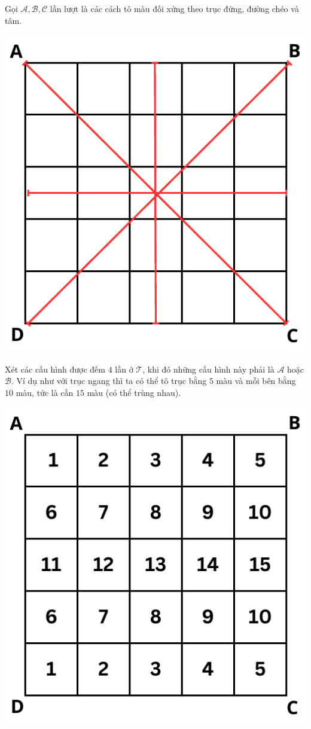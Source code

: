 \documentclass[11pt]{scrartcl}
\begin{document}
\begin{itemize}[label=, leftmargin=0em, itemsep=0.5em]
\begin{sol}
           
            Gọi $\mathcal{A},\mathcal{B},\mathcal{C}$ lần lượt là các cách tô màu đối xứng theo trục đứng, đường chéo và tâm.
            \begin{center}
                \includegraphics[scale=0.57]{Image/ex1.pdf}
            \end{center}
            Xét các cấu hình được đếm $4$ lần ở $\mathcal{T}$, khi đó những cấu hình này phải là $\mathcal{A}$ hoặc $\mathcal{B}$. Ví dụ như với trục ngang thì ta có thể tô trục bằng $5$ màu và mỗi bên bằng $10$ màu, tức là cần $15$ màu (có thể trùng nhau).
            \begin{center}
                \includegraphics[scale=0.57]{Image/trucngang.pdf}

\end{center}
\end{sol}
\end{itemize}
\end{document}
